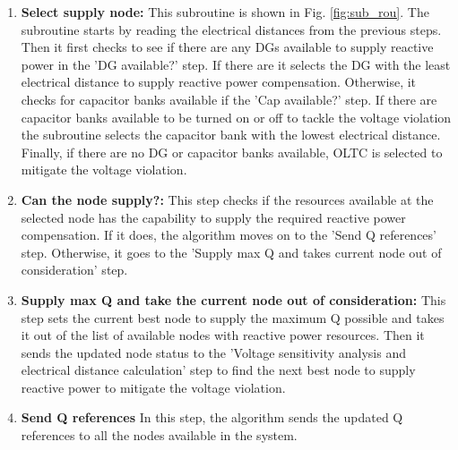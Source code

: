 \begin{enumerate}
    \item \textbf{Select supply node:} This subroutine is shown in Fig. \ref{fig:sub_rou}. The subroutine starts by reading the electrical distances from the previous steps. Then it first checks to see if there are any DGs available to supply reactive power in the 'DG available?' step. If there are it selects the DG with the least electrical distance to supply reactive power compensation. Otherwise, it checks for capacitor banks available if the 'Cap available?' step. If there are capacitor banks available to be turned on or off to tackle the voltage violation the subroutine selects the capacitor bank with the lowest electrical distance. Finally, if there are no DG or capacitor banks available, OLTC is selected to mitigate the voltage violation. 
    
    \item \textbf{Can the node supply?:} This step checks if the resources available at the selected node has the capability to supply the required reactive power compensation. If it does, the algorithm moves on to the 'Send Q references' step. Otherwise, it goes to the 'Supply max Q and takes current node out of consideration' step.
    
    
     \item \textbf{Supply max Q and take the current node out of consideration:} This step sets the current best node to supply the maximum Q possible and takes it out of the list of available nodes with reactive power resources. Then it sends the updated node status to the 'Voltage sensitivity analysis and electrical distance calculation' step to find the next best node to supply reactive power to mitigate the voltage violation.
     
     \item \textbf{Send Q references} In this step, the algorithm sends the updated Q references to all the nodes available in the system.
\end{enumerate}

